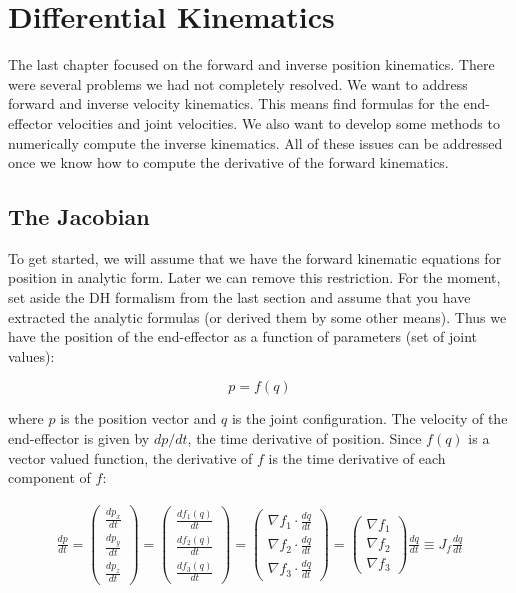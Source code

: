 \hypertarget{differential-kinematics}{%
\section{Differential Kinematics}\label{differential-kinematics}}

The last chapter focused on the forward and inverse position kinematics.
There were several problems we had not completely resolved. We want to
address forward and inverse velocity kinematics. This means find
formulas for the end-effector velocities and joint velocities. We also
want to develop some methods to numerically compute the inverse
kinematics. All of these issues can be addressed once we know how to
compute the derivative of the forward kinematics.

\hypertarget{jacobians}{%
\subsection{The Jacobian}\label{jacobians}}

To get started, we will assume that we have the forward kinematic
equations for position in analytic form. Later we can remove this
restriction. For the moment, set aside the DH formalism from the last
section and assume that you have extracted the analytic formulas (or
derived them by some other means). Thus we have the position of the
end-effector as a function of parameters (set of joint values):

\[p = f(q)\]

where \(p\) is the position vector and \(q\) is the joint configuration.
The velocity of the end-effector is given by \(dp/dt\), the time
derivative of position. Since \(f(q)\) is a vector valued function, the
derivative of \(f\) is the time derivative of each component of \(f\):

\[\begin{aligned}
\frac{dp}{dt} =  \begin{pmatrix} \displaystyle \frac{dp_x}{dt} \\[3mm] \displaystyle \frac{dp_y}{dt}  \\[3mm] \displaystyle \frac{dp_z}{dt}  \end{pmatrix}
= \begin{pmatrix} \displaystyle \frac{df_1(q)}{dt} \\[3mm] \displaystyle \frac{df_2(q)}{dt}  \\[3mm] \displaystyle \frac{df_3(q)}{dt}  \end{pmatrix}
= \begin{pmatrix} \displaystyle \nabla f_1 \cdot\frac{dq}{dt} \\[3mm] \displaystyle \nabla f_2\cdot\frac{dq}{dt}  \\[3mm] \displaystyle \nabla f_3 \cdot\frac{dq}{dt}  \end{pmatrix}
= \begin{pmatrix} \displaystyle \nabla f_1 \\[3mm] \displaystyle \nabla f_2  \\[3mm] \displaystyle \nabla f_3  \end{pmatrix} \frac{dq}{dt}
  \equiv J_f \frac{dq}{dt}
\end{aligned}\]

